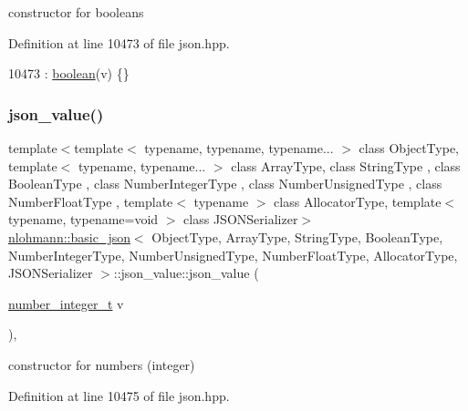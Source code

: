 constructor for booleans 



Definition at line 10473 of file json.\+hpp.


\begin{DoxyCode}
10473 : \hyperlink{unionnlohmann_1_1basic__json_1_1json__value_afd0f8ec00c40301efffd01a276959371}{boolean}(v) \{\}
\end{DoxyCode}
\mbox{\label{unionnlohmann_1_1basic__json_1_1json__value_a590de5a8704d5e3f0dba1cc47b8314a5}} 
\subsubsection{\texorpdfstring{json\+\_\+value()}{json\_value()}\hspace{0.1cm}{\footnotesize\ttfamily [3/12]}}
{\footnotesize\ttfamily template$<$template$<$ typename, typename, typename... $>$ class Object\+Type, template$<$ typename, typename... $>$ class Array\+Type, class String\+Type , class Boolean\+Type , class Number\+Integer\+Type , class Number\+Unsigned\+Type , class Number\+Float\+Type , template$<$ typename $>$ class Allocator\+Type, template$<$ typename, typename=void $>$ class J\+S\+O\+N\+Serializer$>$ \\
\hyperlink{classnlohmann_1_1basic__json}{nlohmann\+::basic\+\_\+json}$<$ Object\+Type, Array\+Type, String\+Type, Boolean\+Type, Number\+Integer\+Type, Number\+Unsigned\+Type, Number\+Float\+Type, Allocator\+Type, J\+S\+O\+N\+Serializer $>$\+::json\+\_\+value\+::json\+\_\+value (\begin{DoxyParamCaption}\item[{\hyperlink{classnlohmann_1_1basic__json_a98e611d67b7bd75307de99c9358ab2dc}{number\+\_\+integer\+\_\+t}}]{v }\end{DoxyParamCaption})\hspace{0.3cm}{\ttfamily [inline]}, {\ttfamily [noexcept]}}



constructor for numbers (integer) 



Definition at line 10475 of file json.\+hpp.


